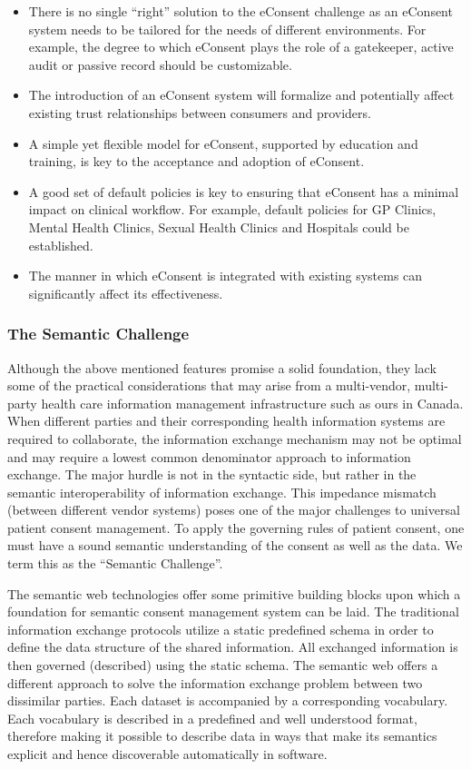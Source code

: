 \documentclass[conference]{IEEEtran}
\begin{document}
\begin{itemize}
 \item There is no single “right” solution to the eConsent challenge as an eConsent system needs to be tailored for the needs of different environments. For
example, the degree to which eConsent plays the role of a gatekeeper, active audit or passive record should be customizable. 
\item The introduction of an eConsent system will formalize and potentially affect existing trust relationships between consumers and providers. 
\item A simple yet flexible model for eConsent, supported by education and training, is key to the acceptance and adoption of eConsent. 
\item A good set of default policies is key to ensuring that eConsent has a minimal impact on clinical workflow. For example, default policies for GP Clinics,
Mental Health Clinics, Sexual Health Clinics and Hospitals could be established. 
\item The manner in which eConsent is integrated with existing systems can significantly affect its effectiveness. 
\end{itemize}

\subsubsection*{The Semantic Challenge}
Although the above mentioned features promise a solid foundation, they lack some of the practical considerations that may arise from a multi-vendor,
multi-party health care information management infrastructure such as ours in Canada.  When different parties and their corresponding health information systems
are required to collaborate, the information exchange mechanism may not be optimal and may require a lowest common denominator approach to information
exchange. The major hurdle is not in the syntactic side, but rather in the semantic interoperability of information exchange.  This impedance mismatch (between
different vendor
systems) poses one of the major challenges to universal patient consent management. To apply the governing rules of patient consent, one must have a sound
semantic understanding of the consent as well as the data.  We term this as the ``Semantic Challenge''.  

The semantic web technologies offer some primitive building blocks upon which a foundation for semantic consent management system can be laid.  The
traditional information exchange protocols utilize a static predefined schema in order to define the data structure of the shared information. All exchanged
information is then governed (described) using the static schema.  The semantic web offers a different approach to solve the information exchange problem
between two dissimilar parties.  Each dataset is accompanied by a corresponding vocabulary.  Each vocabulary is described in a predefined and well understood
format, therefore making it possible to describe data in ways that make its semantics explicit and hence discoverable automatically in software.
\end{document}
